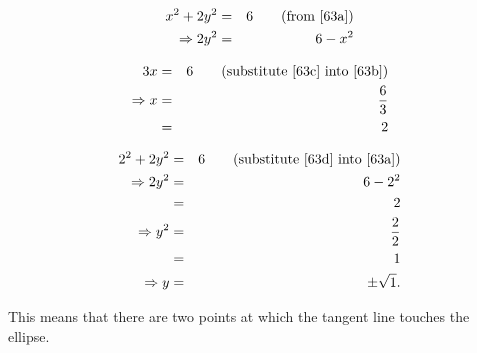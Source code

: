 \begin{eqnarray}
	x^2+2y^2&=&6\qquad\mbox{(from \ref{63a})}\nonumber\\
	\Rightarrow2y^2&=&6-x^2\label{63c}
\end{eqnarray}

\begin{eqnarray}
	3x&=&6\qquad\mbox{(substitute \ref{63c} into \ref{63b})}\nonumber\\
	\Rightarrow x&=&\frac{6}{3}\label{63d}\\
	&=&2\nonumber
\end{eqnarray}

\begin{eqnarray*}
	2^2+2y^2&=&6\qquad\mbox{(substitute \ref{63d} into \ref{63a})}\\
	\Rightarrow2y^2&=&6-2^2\\
	&=&2\\
	\Rightarrow y^2&=&\frac{2}{2}\\
	&=&1\\
	\Rightarrow y&=&\pm\sqrt{1}.
\end{eqnarray*}

This means that there are two points at which the tangent line touches the ellipse.
